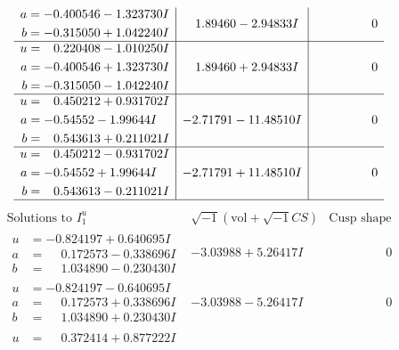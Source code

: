 \documentclass[1p]{elsarticle_modified}
\theoremstyle{definition}
\newcommand{\I}{\sqrt{-1}}
\begin{document}
$$\begin{array}{c|c|c}
\begin{aligned}
a &= -0.400546 - 1.323730 I \\
b &= -0.315050 + 1.042240 I\end{aligned}
 & \phantom{-}1.89460 - 2.94833 I & \phantom{-0.000000 } 0 \\ \hline\begin{aligned}
u &= \phantom{-}0.220408 - 1.010250 I \\
a &= -0.400546 + 1.323730 I \\
b &= -0.315050 - 1.042240 I\end{aligned}
 & \phantom{-}1.89460 + 2.94833 I & \phantom{-0.000000 } 0 \\ \hline\begin{aligned}
u &= \phantom{-}0.450212 + 0.931702 I \\
a &= -0.54552 - 1.99644 I \\
b &= \phantom{-}0.543613 + 0.211021 I\end{aligned}
 & -2.71791 - 11.48510 I & \phantom{-0.000000 } 0 \\ \hline\begin{aligned}
u &= \phantom{-}0.450212 - 0.931702 I \\
a &= -0.54552 + 1.99644 I \\
b &= \phantom{-}0.543613 - 0.211021 I\end{aligned}
 & -2.71791 + 11.48510 I & \phantom{-0.000000 } 0\\
 \hline 
 \end{array}$$\newpage$$\begin{array}{c|c|c}  
\text{Solutions to }I^u_{1}& \I (\text{vol} + \sqrt{-1}CS) & \text{Cusp shape}\\
 \hline 
\begin{aligned}
u &= -0.824197 + 0.640695 I \\
a &= \phantom{-}0.172573 - 0.338696 I \\
b &= \phantom{-}1.034890 - 0.230430 I\end{aligned}
 & -3.03988 + 5.26417 I & \phantom{-0.000000 } 0 \\ \hline\begin{aligned}
u &= -0.824197 - 0.640695 I \\
a &= \phantom{-}0.172573 + 0.338696 I \\
b &= \phantom{-}1.034890 + 0.230430 I\end{aligned}
 & -3.03988 - 5.26417 I & \phantom{-0.000000 } 0 \\ \hline\begin{aligned}
u &= \phantom{-}0.372414 + 0.877222 I \\

\end{aligned}
\end{array}$$
\end{document}
